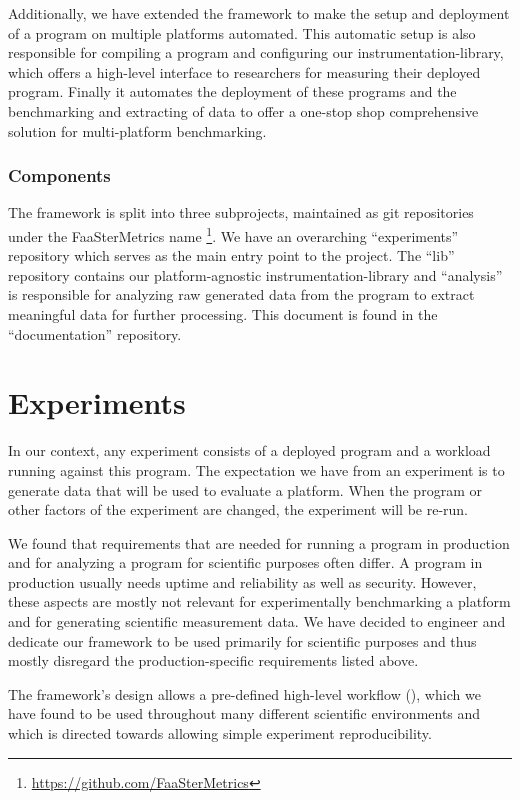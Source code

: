 \documentclass[../main.tex]{subfiles}
\begin{document}
Additionally, we have extended the framework to make the setup and deployment of a program on multiple platforms automated. 
This automatic setup is also responsible for compiling a program and configuring our instrumentation-library, 
which offers a high-level interface to researchers for measuring their deployed program. 
Finally it automates the deployment of these programs and the benchmarking and extracting of data 
to offer a one-stop shop comprehensive solution for multi-platform benchmarking.

\subsubsection{Components}%
\label{sub:frameworkComponents}

The framework is split into three subprojects, maintained as git repositories under the FaaSterMetrics name%
\footnote{\url{https://github.com/FaaSterMetrics}}. 
We have an overarching ``experiments'' repository which serves as the main entry point to the project.
The ``lib'' repository contains our platform-agnostic instrumentation-library
and ``analysis'' is responsible for analyzing raw generated data from the program to extract meaningful data for further processing.  
This document is found in the ``documentation'' repository.


\section{Experiments}%
\label{sec:experiments}

In our context, any experiment consists of a deployed program and a workload running against this program.
The expectation we have from an experiment is to generate data that will be used to evaluate a platform. 
When the program or other factors of the experiment are changed, the experiment will be re-run.

We found that requirements that are needed for running a program in production and 
for analyzing a program for scientific purposes often differ. 
A program in production usually needs uptime and reliability as well as security. 
However, these aspects are mostly not relevant for experimentally benchmarking a platform and for generating scientific measurement data. 
We have decided to engineer and dedicate our framework to be used primarily for scientific purposes
and thus mostly disregard the production-specific requirements listed above.

The framework's design allows a pre-defined high-level workflow (),
which we have found to be used throughout many different scientific environments 
and which is directed towards allowing simple experiment reproducibility.
\end{document}
